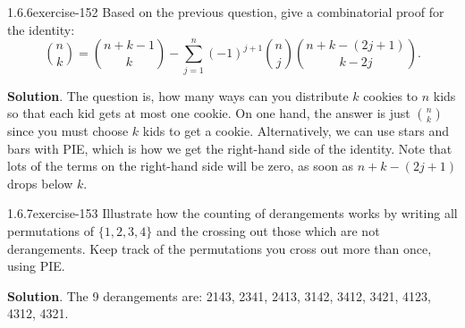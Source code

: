 \documentclass[twoside,11pt,]{book}
\numberwithin{equation}{chapter}
\begin{document}
\begin{divisionsolution}{1.6.6}{}{exercise-152}%
\hypertarget{p-2542}{}%
Based on the previous question, give a combinatorial proof for the identity:%
\begin{equation*}
{n \choose k} = {n+k-1 \choose k} - \sum_{j=1}^n (-1)^{j+1}{n \choose j}{n+k-(2j+1) \choose k - 2j}\text{.}
\end{equation*}
%
\par\smallskip%
\noindent\textbf{Solution}.\quad%
\hypertarget{p-2543}{}%
The question is, how many ways can you distribute \(k\) cookies to \(n\) kids so that each kid gets at most one cookie. On one hand, the answer is just \({n \choose k}\) since you must choose \(k\) kids to get a cookie. Alternatively, we can use stars and bars with PIE, which is how we get the right-hand side of the identity. Note that lots of the terms on the right-hand side will be zero, as soon as \(n+k-(2j+1)\) drops below \(k\).%
\end{divisionsolution}%
\begin{divisionsolution}{1.6.7}{}{exercise-153}%
\hypertarget{p-2544}{}%
Illustrate how the counting of derangements works by writing all permutations of \(\{1,2,3,4\}\) and the crossing out those which are not derangements. Keep track of the permutations you cross out more than once, using PIE.%
\par\smallskip%
\noindent\textbf{Solution}.\quad%
\hypertarget{p-2545}{}%
The 9 derangements are: 2143, 2341, 2413, 3142, 3412, 3421, 4123, 4312, 4321.%
\end{divisionsolution}%
\end{document}
